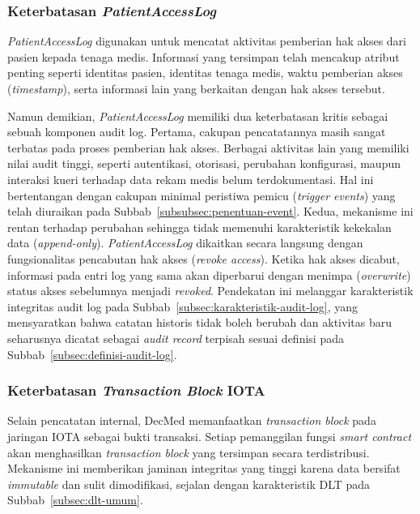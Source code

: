 \subsubsection{Keterbatasan \textit{PatientAccessLog}}
\label{subsubsec:keterbatasan-patientaccesslog}

\textit{PatientAccessLog} digunakan untuk mencatat aktivitas pemberian hak akses dari pasien kepada tenaga medis. Informasi yang tersimpan telah mencakup atribut penting seperti identitas pasien, identitas tenaga medis, waktu pemberian akses (\textit{timestamp}), serta informasi lain yang berkaitan dengan hak akses tersebut.

Namun demikian, \textit{PatientAccessLog} memiliki dua keterbatasan kritis sebagai sebuah komponen audit log. Pertama, cakupan pencatatannya masih sangat terbatas pada proses pemberian hak akses. Berbagai aktivitas lain yang memiliki nilai audit tinggi, seperti autentikasi, otorisasi, perubahan konfigurasi, maupun interaksi kueri terhadap data rekam medis belum terdokumentasi. Hal ini bertentangan dengan cakupan minimal peristiwa pemicu (\textit{trigger events}) yang telah diuraikan pada Subbab~\ref{subsubsec:penentuan-event}. Kedua, mekanisme ini rentan terhadap perubahan sehingga tidak memenuhi karakteristik kekekalan data (\textit{append-only}). \textit{PatientAccessLog} dikaitkan secara langsung dengan fungsionalitas pencabutan hak akses (\textit{revoke access}). Ketika hak akses dicabut, informasi pada entri log yang sama akan diperbarui dengan menimpa (\textit{overwrite}) status akses sebelumnya menjadi \textit{revoked}. Pendekatan ini melanggar karakteristik integritas audit log pada Subbab~\ref{subsec:karakteristik-audit-log}, yang mensyaratkan bahwa catatan historis tidak boleh berubah dan aktivitas baru seharusnya dicatat sebagai \textit{audit record} terpisah sesuai definisi pada Subbab~\ref{subsec:definisi-audit-log}.

\subsubsection{Keterbatasan \textit{Transaction Block} IOTA}
\label{subsubsec:keterbatasan-tx-block}

Selain pencatatan internal, DecMed memanfaatkan \textit{transaction block} pada jaringan IOTA sebagai bukti transaksi. Setiap pemanggilan fungsi \textit{smart contract} akan menghasilkan \textit{transaction block} yang tersimpan secara terdistribusi. Mekanisme ini memberikan jaminan integritas yang tinggi karena data bersifat \textit{immutable} dan sulit dimodifikasi, sejalan dengan karakteristik DLT pada Subbab~\ref{subsec:dlt-umum}.

